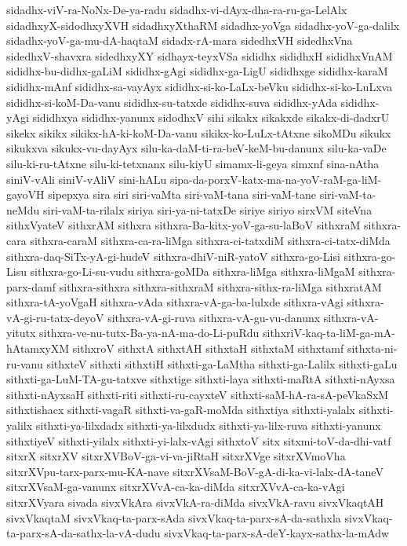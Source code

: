 {sidadhx-viV-ra-NoNx-De-ya-radu
sidadhx-vi-dAyx-dha-ra-ru-ga-LelAlx
sidadhxyX-sidodhxyXVH
sidadhxyXthaRM
sidadhx-yoVga
sidadhx-yoV-ga-dalilx
sidadhx-yoV-ga-mu-dA-haqtaM
sidadx-rA-mara
sidedhxVH
sidedhxVna
sidedhxV-shavxra
sidedhxyXY
sidhayx-teyxVSa
sididhx
sididhxH
sididhxVnAM
sididhx-bu-didhx-gaLiM
sididhx-gAgi
sididhx-ga-LigU
sididhxge
sididhx-karaM
sididhx-mAnf
sididhx-sa-vayAyx
sididhx-si-ko-LaLx-beVku
sididhx-si-ko-LuLxva
sididhx-si-koM-Da-vanu
sididhx-su-tatxde
sididhx-suva
sididhx-yAda
sididhx-yAgi
sididhxya
sididhx-yanunx
sidodhxV
sihi
sikakx
sikakxde
sikakx-di-dadxrU
sikekx
sikikx
sikikx-hA-ki-koM-Da-vanu
sikikx-ko-LuLx-tAtxne
sikoMDu
sikukx
sikukxva
sikukx-vu-dayAyx
silu-ka-daM-ti-ra-beV-keM-bu-danunx
silu-ka-vaDe
silu-ki-ru-tAtxne
silu-ki-tetxnanx
silu-kiyU
simamx-li-geya
simxnf
sina-nAtha
siniV-vAli
siniV-vAliV
sini-hALu
sipa-da-porxV-katx-ma-na-yoV-raM-ga-liM-gayoVH
sipepxya
sira
siri
siri-vaMta
siri-vaM-tana
siri-vaM-tane
siri-vaM-ta-neMdu
siri-vaM-ta-rilalx
siriya
siri-ya-ni-tatxDe
siriye
siriyo
sirxVM
siteVna
sithxVyateV
sithxrAM
sithxra
sithxra-Ba-kitx-yoV-ga-su-laBoV
sithxraM
sithxra-cara
sithxra-caraM
sithxra-ca-ra-liMga
sithxra-ci-tatxdiM
sithxra-ci-tatx-diMda
sithxra-daq-SiTx-yA-gi-hudeV
sithxra-dhiV-niR-yatoV
sithxra-go-Lisi
sithxra-go-Lisu
sithxra-go-Li-su-vudu
sithxra-goMDa
sithxra-liMga
sithxra-liMgaM
sithxra-parx-damf
sithxra-sithxra
sithxra-sithxraM
sithxra-sithx-ra-liMga
sithxratAM
sithxra-tA-yoVgaH
sithxra-vAda
sithxra-vA-ga-ba-lulxde
sithxra-vAgi
sithxra-vA-gi-ru-tatx-deyoV
sithxra-vA-gi-ruva
sithxra-vA-gu-vu-danunx
sithxra-vA-yitutx
sithxra-ve-nu-tutx-Ba-ya-nA-ma-do-Li-puRdu
sithxriV-kaq-ta-liM-ga-mA-hAtamxyXM
sithxroV
sithxtA
sithxtAH
sithxtaH
sithxtaM
sithxtamf
sithxta-ni-ru-vanu
sithxteV
sithxti
sithxtiH
sithxti-ga-LaMtha
sithxti-ga-Lalilx
sithxti-gaLu
sithxti-ga-LuM-TA-gu-tatxve
sithxtige
sithxti-laya
sithxti-maRtA
sithxti-nAyxsa
sithxti-nAyxsaH
sithxti-riti
sithxti-ru-cayxteV
sithxti-saM-hA-ra-sA-peVkaSxM
sithxtishacx
sithxti-vagaR
sithxti-va-gaR-moMda
sithxtiya
sithxti-yalalx
sithxti-yalilx
sithxti-ya-lilxdadx
sithxti-ya-lilxdudx
sithxti-ya-lilx-ruva
sithxti-yanunx
sithxtiyeV
sithxti-yilalx
sithxti-yi-lalx-vAgi
sithxtoV
sitx
sitxmi-toV-da-dhi-vatf
sitxrX
sitxrXV
sitxrXVBoV-ga-vi-va-jiRtaH
sitxrXVge
sitxrXVmoVha
sitxrXVpu-tarx-parx-mu-KA-nave
sitxrXVsaM-BoV-gA-di-ka-vi-lalx-dA-taneV
sitxrXVsaM-ga-vanunx
sitxrXVvA-ca-ka-diMda
sitxrXVvA-ca-ka-vAgi
sitxrXVyara
sivada
sivxVkAra
sivxVkA-ra-diMda
sivxVkA-ravu
sivxVkaqtAH
sivxVkaqtaM
sivxVkaq-ta-parx-sAda
sivxVkaq-ta-parx-sA-da-sathxla
sivxVkaq-ta-parx-sA-da-sathx-la-vA-dudu
sivxVkaq-ta-parx-sA-deY-kayx-sathx-la-mAdw
}
